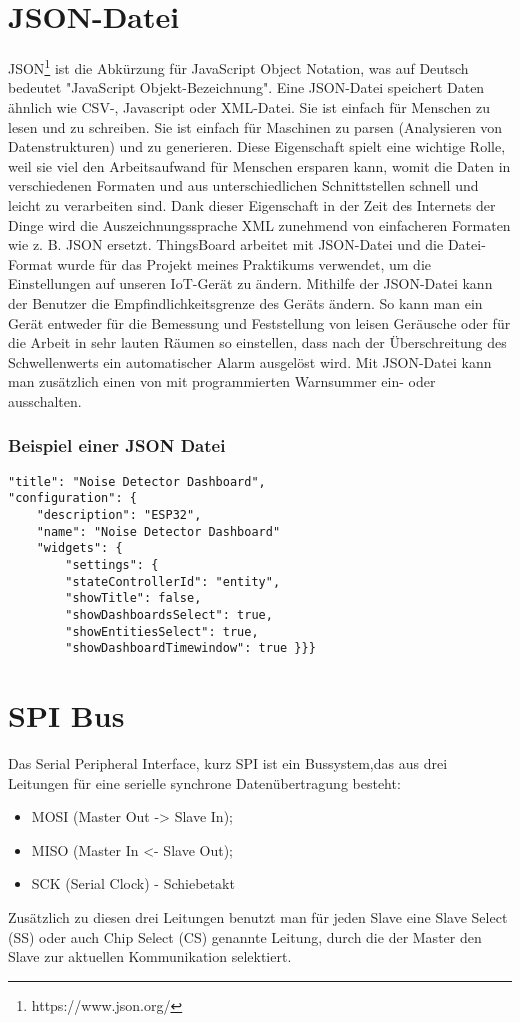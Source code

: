 \section{JSON-Datei}
\label{sec:appendix:json}
JSON\footnote{https://www.json.org/} ist die Abkürzung für JavaScript Object Notation, was auf Deutsch bedeutet "JavaScript Objekt-Bezeichnung". Eine JSON-Datei speichert Daten ähnlich wie CSV-, Javascript oder XML-Datei. Sie ist einfach für Menschen zu lesen und zu schreiben. Sie ist einfach für Maschinen zu parsen (Analysieren von Datenstrukturen) und zu generieren. Diese Eigenschaft spielt eine wichtige Rolle, weil sie viel den Arbeitsaufwand für Menschen ersparen kann, womit die Daten in verschiedenen Formaten und aus unterschiedlichen Schnittstellen schnell und leicht zu verarbeiten sind. Dank dieser Eigenschaft in der Zeit des Internets der Dinge wird die Auszeichnungssprache XML zunehmend von einfacheren Formaten wie z. B. JSON ersetzt. 
ThingsBoard arbeitet mit JSON-Datei und die Datei-Format wurde für das Projekt meines Praktikums verwendet, um die Einstellungen auf unseren IoT-Gerät zu ändern. Mithilfe der JSON-Datei kann der Benutzer die Empfindlichkeitsgrenze des Geräts ändern. So kann man ein Gerät entweder für die Bemessung und Feststellung von leisen Geräusche oder für die Arbeit in sehr lauten Räumen so einstellen, dass nach der Überschreitung des Schwellenwerts ein automatischer Alarm ausgelöst wird. Mit JSON-Datei kann man zusätzlich einen von mit programmierten Warnsummer ein- oder ausschalten.  
\subsubsection{Beispiel einer JSON Datei}
\begin{lstlisting}
"title": "Noise Detector Dashboard",
"configuration": {
	"description": "ESP32",
	"name": "Noise Detector Dashboard"
	"widgets": {
		"settings": {
		"stateControllerId": "entity",
		"showTitle": false,
		"showDashboardsSelect": true,
		"showEntitiesSelect": true,
		"showDashboardTimewindow": true }}}  

\end{lstlisting}

\section{SPI Bus}
Das Serial Peripheral Interface, kurz SPI ist ein Bussystem,das aus drei Leitungen für eine serielle synchrone Datenübertragung besteht:
\begin{itemize}
	\item  MOSI (Master Out -> Slave In);
	\item  MISO (Master In <- Slave Out);
	\item  SCK (Serial Clock) - Schiebetakt
\end{itemize}
Zusätzlich zu diesen drei Leitungen benutzt man für jeden Slave eine Slave Select (SS) oder auch Chip Select (CS) genannte Leitung, durch die der Master den Slave zur aktuellen Kommunikation selektiert.
